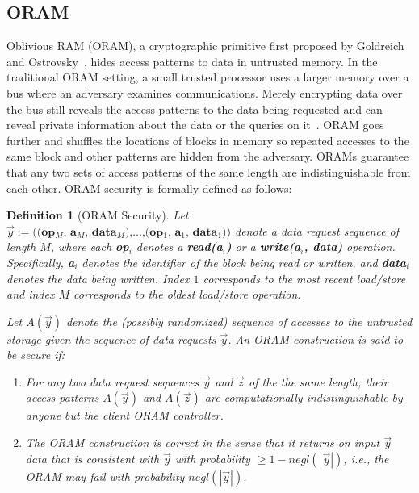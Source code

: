\documentclass[letterpaper,twocolumn,10pt]{article}
\newtheorem{definition}[theorem]{Definition}
\begin{document}
\subsection{ORAM}
Oblivious RAM (ORAM), a cryptographic primitive first proposed by Goldreich and Ostrovsky~\cite{GO96}, hides access patterns to data in untrusted memory. In the traditional ORAM setting, a small trusted processor uses a larger memory over a bus where an adversary examines communications. Merely encrypting data over the bus still reveals the access patterns to the data being requested and can reveal private information about the data or the queries on it~\cite{IKK12}. ORAM goes further and shuffles the locations of blocks in memory so repeated accesses to the same block and other patterns are hidden from the adversary. ORAMs guarantee that any two sets of access patterns of the same length are indistinguishable from each other. ORAM security is formally defined as follows:
\begin{definition}[ORAM Security\cite{SDS+13}]
Let $\overrightarrow{y}:=\textbf{((op$_M$, a$_M$, data$_M$),...,(op$_1$, a$_1$, data$_1$))}$ denote a data request sequence of length $M$, where each \textbf{op$_i$} denotes a \textbf{read(a$_i$)} or a \textbf{write(a$_i$, data)} operation. Specifically, \textbf{a$_i$} denotes the identifier of the block being read or written, and \textbf{data$_i$} denotes the data being written. Index $1$ corresponds to the most recent load/store and index $M$ corresponds to the oldest load/store operation.

Let $A(\overrightarrow{y})$ denote the (possibly randomized) sequence of accesses to the untrusted storage given the sequence of data requests $\overrightarrow{y}$. An ORAM construction is said to be secure if:
\begin{enumerate}
\setlength\itemsep{0pt}
\item For any two data request sequences $\overrightarrow{y}$ and $\overrightarrow{z}$ of the the same length, their access patterns $A(\overrightarrow{y})$ and $A(\overrightarrow{z})$ are computationally indistinguishable by anyone but the client ORAM controller.

\item The ORAM construction is correct in the sense that it returns on input $\overrightarrow{y}$ data that is consistent with $\overrightarrow{y}$ with probability $\geq 1 - \textit{negl}(|\overrightarrow{y}|)$, i.e., the ORAM may fail with probability $\textit{negl}(|\overrightarrow{y}|)$.
\end{enumerate}
\end{definition}
\end{document}
